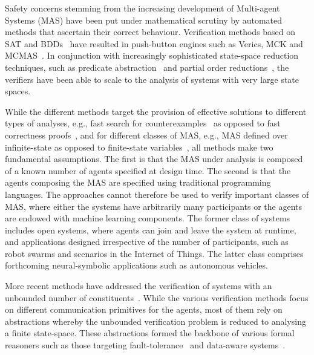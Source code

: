 Safety concerns stemming from the increasing development of Multi-agent Systems
(MAS) have been put under mathematical scrutiny
by automated methods that ascertain their correct behaviour. Verification
methods based on SAT and
BDDs~\cite{KacprzakLomuscioPenczek04b,RaimondiLomuscio05c} have resulted in
push-button engines such as Verics, MCK and
MCMAS~\cite{GammieMeyden04a,Kacprzak+07a,LomuscioQuRaimondi15}.  In conjunction
with increasingly sophisticated state-space reduction techniques, such as
predicate abstraction~\cite{lomuscio2015verifying} and partial order
reductions~\cite{jamroga2020towards}, the verifiers have been able to scale to
the analysis of systems with very large state spaces.


While the different methods target the provision of effective solutions to
different types of analyses, e.g., fast search for
counterexamples~\cite{penczek2003verifying} as opposed to fast correctness
proofs~\cite{ball2006abstraction}, and for different classes of MAS, e.g., MAS
defined over infinite-state as opposed to finite-state
variables~\cite{lomuscio2015verifying}, all methods make two fundamental
assumptions. The first is that the MAS under analysis is composed of a known
number of agents specified at design time. The second is that the agents
composing the MAS are specified using traditional programming languages.  The
approaches cannot
therefore be used to verify important classes of MAS, where either the systems
have arbitrarily many participants or the agents are endowed with machine
learning components. The former class of systems includes open systems, where
agents can join and leave the system at runtime, and applications designed
irrespective of the number of participants, such as robot
swarms and scenarios
in the Internet of Things. The latter class comprises forthcoming
neural-symbolic applications such as autonomous vehicles.

More recent methods have addressed the verification of
systems with an unbounded number of
constituents~\cite{KouvarosLomuscio16a,KouvarosLomuscio16c}.
While the various verification methods focus on different communication
primitives for the agents, most of them rely on abstractions
whereby the unbounded verification problem is reduced to
analysing a finite state-space. These  abstractions 
formed the backbone of various formal reasoners such as
those targeting
fault-tolerance~\cite{KouvarosLomuscioPirovano18} and
data-aware systems~\cite{BelardinelliKouvarosLomuscio17}.

